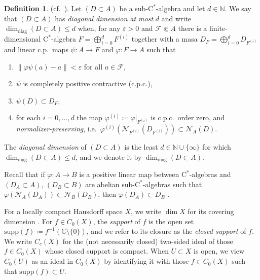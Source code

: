 \documentclass[11pt,a4paper]{amsart}
\theoremstyle{definition}
\newtheorem{definition}[theorem]{Definition}
\numberwithin{equation}{section}
\newcommand{\mc}[1]{\mathcal{#1}}
\newcommand{\bb}[1]{\mathbb{#1}}
\def\supp{\mathrm{supp}}
\begin{document}
\begin{definition}\label{def:dimdiag}(cf.\ \cite[Definition~A]{LiLiaWin23}).
Let $(D\subset A)$ be a sub-$\mathrm{C}^\ast$-algebra and let $d\in\bb{N}$. We say that $(D\subset A)$ has \emph{diagonal dimension at most} $d$ and write $\dim_\mathrm{diag}(D\subset A)\le d$ when, for any $\varepsilon>0$ and $\mc{F}\Subset A$ there is a finite-dimensional $\mathrm{C}^\ast$-algebra $F=\bigoplus_{i=0}^dF^{(i)}$ together with a masa $D_F=\bigoplus_{i=0}^dD_{F^{(i)}}$ and linear c.p.\ maps $\psi\colon A\to F$ and $\varphi\colon F\to A$ such that
\begin{enumerate}[label=(\roman*)]
\item $\|\varphi\psi(a)-a\|<\varepsilon$ for all $a\in\mc{F}$,
\item $\psi$ is completely positive contractive (c.p.c.),
\item $\psi(D)\subset D_F$,
\item for each $i=0,\dots,d$ the map $\varphi^{(i)}\coloneqq\varphi\vert_{F^{(i)}}$ is c.p.c.\ order zero, and \emph{normalizer-preserving}, i.e.\ $\varphi^{(i)}(\mc{N}_{F^{(i)}}(D_{F^{(i)}}))\subset \mc{N}_A(D)$.
\end{enumerate}
The \emph{diagonal dimension} of $(D\subset A)$ is the least $d\in\bb{N}\cup\{\infty\}$ for which $\dim_\mathrm{diag}(D\subset A)\le d$, and we denote it by $\dim_\mathrm{diag}(D\subset A)$.
\end{definition}

Recall that if $\varphi\colon A\to B$ is a positive linear map between $\mathrm{C}^\ast$-algebras and $(D_A\subset A)$, $(D_B\subset B)$ are abelian sub-$\mathrm{C}^\ast$-algebras such that $\varphi(\mc{N}_A(D_A))\subset \mc{N}_B(D_B)$, then $\varphi(D_A)\subset D_B$ \cite[Proposition~1.9]{LiLiaWin23}.

For a locally compact Hausdorff space $X$, we write $\dim X$ for its covering dimension \cite[Definition~1.6.7]{Engelking78}. For $f\in C_0(X)$, the \emph{support} of $f$ is the open set $\supp(f)\coloneqq f^{-1}(\bb{C}\setminus\{0\})$, and we refer to its closure as the \emph{closed support} of $f$. We write $C_c(X)$ for the (not necessarily closed) two-sided ideal of those $f\in C_0(X)$ whose closed support is compact. When $U\subset X$ is open, we view $C_0(U)$ as an ideal in $C_0(X)$ by identifying it with those $f\in C_0(X)$ such that $\supp(f)\subset U$.
\end{document}
